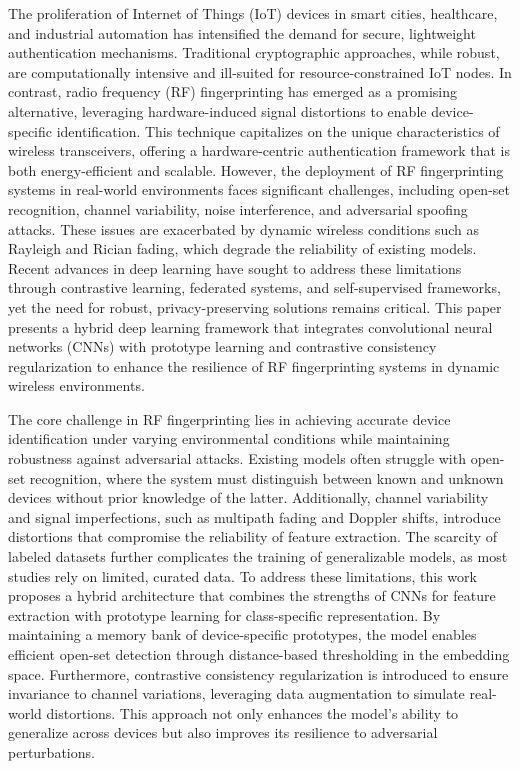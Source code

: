 \documentclass[conference]{IEEEtran}
\begin{document}
The proliferation of Internet of Things (IoT) devices in smart cities, healthcare, and industrial automation has intensified the demand for secure, lightweight authentication mechanisms. Traditional cryptographic approaches, while robust, are computationally intensive and ill-suited for resource-constrained IoT nodes. In contrast, radio frequency (RF) fingerprinting has emerged as a promising alternative, leveraging hardware-induced signal distortions to enable device-specific identification. This technique capitalizes on the unique characteristics of wireless transceivers, offering a hardware-centric authentication framework that is both energy-efficient and scalable. However, the deployment of RF fingerprinting systems in real-world environments faces significant challenges, including open-set recognition, channel variability, noise interference, and adversarial spoofing attacks. These issues are exacerbated by dynamic wireless conditions such as Rayleigh and Rician fading, which degrade the reliability of existing models. Recent advances in deep learning have sought to address these limitations through contrastive learning, federated systems, and self-supervised frameworks, yet the need for robust, privacy-preserving solutions remains critical. This paper presents a hybrid deep learning framework that integrates convolutional neural networks (CNNs) with prototype learning and contrastive consistency regularization to enhance the resilience of RF fingerprinting systems in dynamic wireless environments.  

The core challenge in RF fingerprinting lies in achieving accurate device identification under varying environmental conditions while maintaining robustness against adversarial attacks. Existing models often struggle with open-set recognition, where the system must distinguish between known and unknown devices without prior knowledge of the latter. Additionally, channel variability and signal imperfections, such as multipath fading and Doppler shifts, introduce distortions that compromise the reliability of feature extraction. The scarcity of labeled datasets further complicates the training of generalizable models, as most studies rely on limited, curated data. To address these limitations, this work proposes a hybrid architecture that combines the strengths of CNNs for feature extraction with prototype learning for class-specific representation. By maintaining a memory bank of device-specific prototypes, the model enables efficient open-set detection through distance-based thresholding in the embedding space. Furthermore, contrastive consistency regularization is introduced to ensure invariance to channel variations, leveraging data augmentation to simulate real-world distortions. This approach not only enhances the model's ability to generalize across devices but also improves its resilience to adversarial perturbations.  
\end{document}

